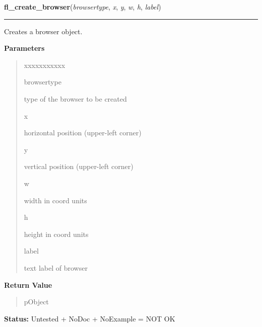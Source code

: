     \label{xformslib:library:fl_create_browser}

    \vspace{0.5ex}

\hspace{.8\funcindent}\begin{boxedminipage}{\funcwidth}

    \raggedright \textbf{fl\_create\_browser}(\textit{browsertype}, \textit{x}, \textit{y}, \textit{w}, \textit{h}, \textit{label})

    \vspace{-1.5ex}

    \rule{\textwidth}{0.5\fboxrule}
\setlength{\parskip}{2ex}
    Creates a browser object.

\setlength{\parskip}{1ex}
      \textbf{Parameters}
      \vspace{-1ex}

      \begin{quote}
        \begin{Ventry}{xxxxxxxxxxx}

          \item[browsertype]

          type of the browser to be created

          \item[x]

          horizontal position (upper-left corner)

          \item[y]

          vertical position (upper-left corner)

          \item[w]

          width in coord units

          \item[h]

          height in coord units

          \item[label]

          text label of browser

        \end{Ventry}

      \end{quote}

      \textbf{Return Value}
    \vspace{-1ex}

      \begin{quote}
      pObject

      \end{quote}

\textbf{Status:} Untested + NoDoc + NoExample = NOT OK



    \end{boxedminipage}

